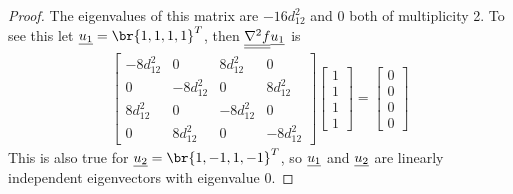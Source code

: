 \documentclass[11pt, oneside]{article}
\begin{document}
\begin{enumerate}
\begin{enumerate}
\begin{proof}
          The eigenvalues of this matrix are $-16d_{12}^2$ and $0$ both of
          multiplicity 2.
          To see this let $\v{u_1} = \br{1, 1, 1, 1}^T$, then
          $\underline{\underline{\nabla^2 f}} \underline{u_1}$ is
          \begin{align*}
            \begin{bmatrix}
              -8d_{12}^2 & 0 & 8d_{12}^2 & 0 \\
              0 & -8d_{12}^2 & 0 & 8d_{12}^2 \\
              8d_{12}^2 & 0 & -8d_{12}^2 & 0 \\
              0 & 8d_{12}^2 & 0 & -8d_{12}^2
            \end{bmatrix}
            \begin{bmatrix}
              1 \\
              1 \\
              1 \\
              1
            \end{bmatrix} =
            \begin{bmatrix}
              0 \\
              0 \\
              0 \\
              0 
            \end{bmatrix}
          \end{align*}
          This is also true for $\v{u_2} = \br{1, -1, 1, -1}^T$, so $\underline{u_1}$
          and $\underline{u_2}$ are linearly independent eigenvectors with eigenvalue 0.


\end{proof}
\end{enumerate}
\end{enumerate}
\end{document}
